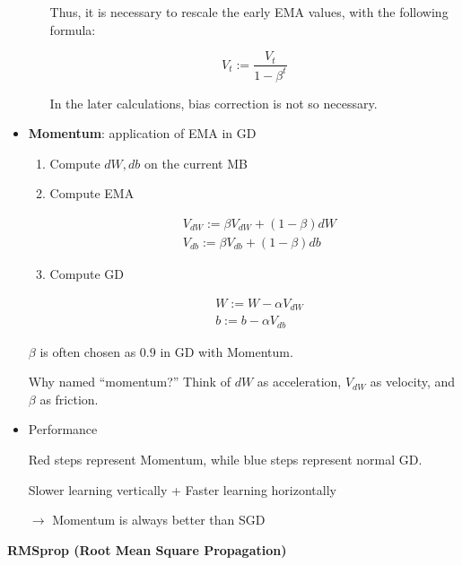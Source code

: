 \documentclass[
]{book}
\begin{document}
\begin{itemize}
\begin{itemize}
    Thus, it is necessary to rescale the early EMA values, with the
    following formula:

    \[\begin{equation}
      V_t:=\frac{V_t}{1-\beta^t}
      \end{equation}\]

    In the later calculations, bias correction is not so necessary.
  \end{itemize}
\item
  \textbf{Momentum}: application of EMA in GD

  \begin{enumerate}
  \def\labelenumi{\arabic{enumi}.}
  \item
    Compute \(dW,db\) on the current MB
  \item
    Compute EMA

    \[\begin{align}
     &V_{dW}:=\beta V_{dW}+(1-\beta)dW \\
     &V_{db}:=\beta V_{db}+(1-\beta)db
     \end{align}\]
  \item
    Compute GD

    \[\begin{align}
     &W:=W-\alpha V_{dW} \\
     &b:=b-\alpha V_{db}
     \end{align}\]
  \end{enumerate}

  \(\beta\) is often chosen as \(0.9\) in GD with Momentum.

  Why named ``momentum?'' Think of \(dW\) as acceleration, \(V_{dW}\) as
  velocity, and \(\beta\) as friction.
\item
  Performance

  Red steps represent Momentum, while blue steps represent normal GD.

  Slower learning vertically + Faster learning horizontally

  \(\rightarrow\) Momentum is always better than SGD
\end{itemize}

\textbf{RMSprop (Root Mean Square Propagation)}
\end{document}
